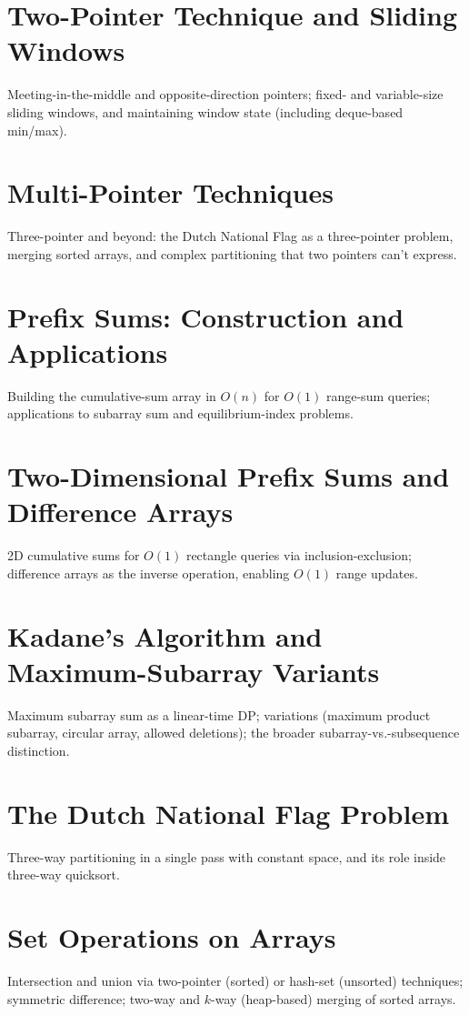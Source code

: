 \chapter{Two-Pointer Technique and Sliding Windows}
Meeting-in-the-middle and opposite-direction pointers; fixed- and variable-size sliding windows, and maintaining window state (including deque-based min/max).

\chapter{Multi-Pointer Techniques}
Three-pointer and beyond: the Dutch National Flag as a three-pointer problem, merging sorted arrays, and complex partitioning that two pointers can't express.

\chapter{Prefix Sums: Construction and Applications}
Building the cumulative-sum array in $O(n)$ for $O(1)$ range-sum queries; applications to subarray sum and equilibrium-index problems.

\chapter{Two-Dimensional Prefix Sums and Difference Arrays}
2D cumulative sums for $O(1)$ rectangle queries via inclusion-exclusion; difference arrays as the inverse operation, enabling $O(1)$ range updates.

\chapter{Kadane's Algorithm and Maximum-Subarray Variants}
Maximum subarray sum as a linear-time DP; variations (maximum product subarray, circular array, allowed deletions); the broader subarray-vs.-subsequence distinction.

\chapter{The Dutch National Flag Problem}
Three-way partitioning in a single pass with constant space, and its role inside three-way quicksort.

\chapter{Set Operations on Arrays}
Intersection and union via two-pointer (sorted) or hash-set (unsorted) techniques; symmetric difference; two-way and $k$-way (heap-based) merging of sorted arrays.


